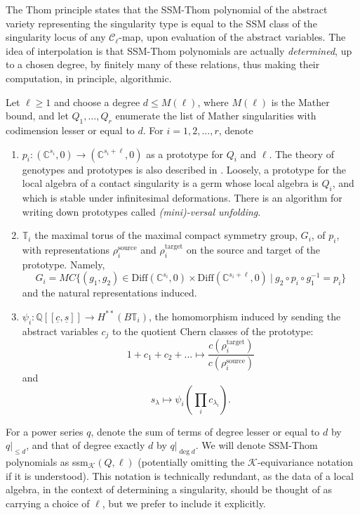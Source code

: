 \documentclass[11pt]{article}
\theoremstyle{plain}
\theoremstyle{definition}
\theoremstyle{definition}
\newcommand{\bb}[1]{\mathbb{#1}}
\newcommand{\C}{\mathbb{C}}
\begin{document}
The Thom principle states that the SSM-Thom polynomial of the abstract variety representing the singularity type is equal to the SSM class of the singularity locus of any $\mathcal C_\ell$-map, upon evaluation of the abstract variables. The idea of interpolation is that SSM-Thom polynomials are actually \textit{determined}, up to a chosen degree, by finitely many of these relations, thus making their computation, in principle, algorithmic. 

Let $\ell\geq1$ and choose a degree $d\leq M(\ell)$, where $M(\ell)$ is the Mather bound, and let $Q_1,\dots,Q_r$ enumerate the list of Mather singularities with codimension lesser or equal to $d$. For $i=1,2,\dots,r$, denote 

\begin{enumerate}
\item $p_i: (\C^{s_i},0)\to (\C^{s_i+\ell},0)$ as a prototype for $Q_i$ and $\ell$. The theory of genotypes and prototypes is also described in \cite{mather}. Loosely, a prototype for the local algebra of a contact singularity is a germ whose local algebra is $Q_i$, and which is stable under infinitesimal deformations. There is an algorithm for writing down prototypes called \textit{(mini)-versal unfolding}.

\item $\bb T_i$ the maximal torus of the maximal compact symmetry group, $G_i$, of $p_i$, with representations $\rho_i^{\text{source}}$ and $\rho_i^{\text{target}}$ on the source and target of the prototype. Namely, 
\[
G_i=MC\{(g_1,g_2)\in\text{Diff}(\C^{s_i},0)\times\text{Diff}(\C^{s_i+\ell},0)\ |\  g_2\circ p_i\circ g_1^{-1}=p_i\}
\]
and the natural representations induced. 
\item $\psi_i: \mathbb Q[[\underline c,\underline s]]\to H^{**}(B\bb T_i)$, the homomorphism induced by sending the abstract variables $c_j$ to the quotient Chern classes of the prototype:
\[
1+c_1+c_2+\dots\mapsto \frac{c(\rho_i^{\text{target}})}{c(\rho_i^{\text{source}})}
\]
and 
\[
s_\lambda\mapsto \psi_i\left(\prod_ic_{\lambda_i}\right).
\]
\end{enumerate}

For a power series $q$, denote the sum of terms of degree lesser or equal to $d$ by $q|_{\leq d}$, and that of degree exactly $d$ by $q|_{\deg d}$. We will denote SSM-Thom polynomials as ssm$_{\mathcal K}(Q,\ell)$ (potentially omitting the $\mathcal K$-equivariance notation if it is understood). This notation is technically redundant, as the data of a local algebra, in the context of determining a singularity, should be thought of as carrying a choice of $\ell$, but we prefer to include it explicitly. 
\end{document}
